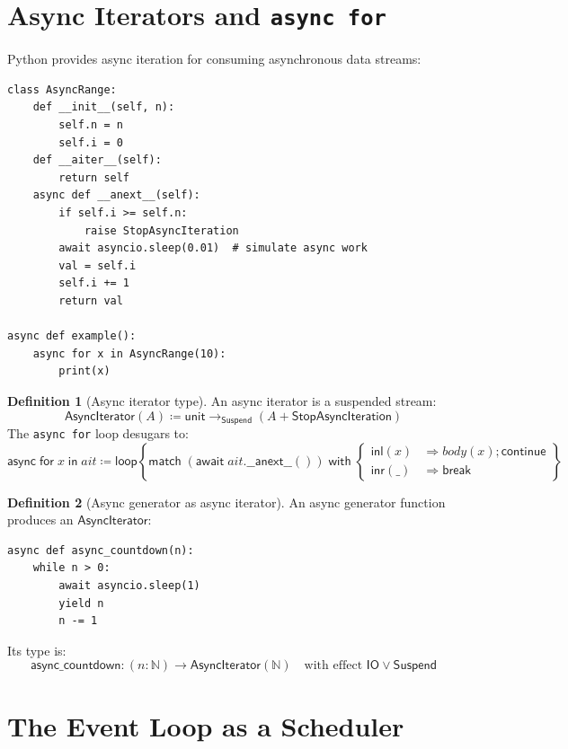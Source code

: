 \documentclass[11pt,a4paper]{report}
\theoremstyle{definition}
\newtheorem{definition}{Definition}[chapter]
\theoremstyle{plain}
\newcommand{\Nat}{\mathbb{N}}
\newcommand{\defeq}{\coloneqq}
\newcommand{\IO}{\mathsf{IO}}
\begin{document}
\section{Async Iterators and \texttt{async for}}

Python provides async iteration for consuming asynchronous data streams:

\begin{lstlisting}[style=python]
class AsyncRange:
    def __init__(self, n):
        self.n = n
        self.i = 0
    def __aiter__(self):
        return self
    async def __anext__(self):
        if self.i >= self.n:
            raise StopAsyncIteration
        await asyncio.sleep(0.01)  # simulate async work
        val = self.i
        self.i += 1
        return val

async def example():
    async for x in AsyncRange(10):
        print(x)
\end{lstlisting}

\begin{definition}[Async iterator type]
An async iterator is a suspended stream:
\[
  \mathsf{AsyncIterator}(A) \defeq \mathsf{unit} \to_{\mathsf{Suspend}}
    (A + \mathsf{StopAsyncIteration})
\]
The \lstinline[style=python]{async for} loop desugars to:
\[
  \mathsf{async\;for}\; x \;\mathsf{in}\; \mathit{ait} \defeq
    \mathsf{loop}\left\{
      \mathsf{match}\;(\mathsf{await}\;\mathit{ait}.\mathsf{\_\_anext\_\_}())\;
      \mathsf{with}\; \begin{cases}
        \mathsf{inl}(x) &\Rightarrow \mathit{body}(x); \mathsf{continue} \\
        \mathsf{inr}(\_) &\Rightarrow \mathsf{break}
      \end{cases}
    \right\}
\]
\end{definition}

\begin{definition}[Async generator as async iterator]
An async generator function produces an $\mathsf{AsyncIterator}$:
\begin{lstlisting}[style=python]
async def async_countdown(n):
    while n > 0:
        await asyncio.sleep(1)
        yield n
        n -= 1
\end{lstlisting}
Its type is:
\[
  \mathsf{async\_countdown} : (n : \Nat) \to
    \mathsf{AsyncIterator}(\Nat)
    \quad \text{with effect } \IO \vee \mathsf{Suspend}
\]
\end{definition}

\section{The Event Loop as a Scheduler}
\end{document}
